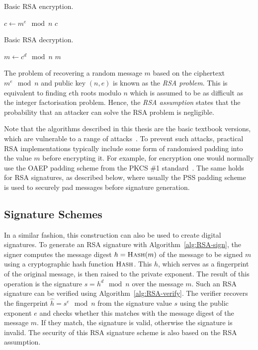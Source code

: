 \begin{algorithm}[ht]
  \caption{Basic RSA encryption.}
  \label{alg:RSA-encrypt}
  \addtolength{\baselineskip}{1mm}
  \begin{algorithmic}[1]
      \State $c \gets m^e \mod n$
      \Return $c$
    \EndFunction
  \end{algorithmic}
\end{algorithm}
\begin{algorithm}[ht]
  \caption{Basic RSA decryption.}
  \label{alg:RSA-decrypt}
  \addtolength{\baselineskip}{1mm}
  \begin{algorithmic}[1]
      \State $m \gets c^d \mod n$
      \Return $m$
    \EndFunction
  \end{algorithmic}
\end{algorithm}

The problem of recovering a random message $m$ based on the ciphertext $m^e \mod n$
and public key $(n, e)$ is known as the \emph{RSA problem}.
This is equivalent to finding $e$th roots modulo $n$ which is assumed to be as
difficult as the integer factorisation problem. Hence, the \emph{RSA assumption} states that
the probability that an attacker can solve the RSA problem is negligible.

Note that the algorithms described in this thesis are the basic textbook
versions, which are vulnerable to a range of attacks~\cite{Hastad1985,
Coppersmith1997}. To prevent such attacks, practical RSA implementations
typically include some form of randomised padding into the value $m$ before
encrypting it. For example, for encryption one would normally use the OAEP
padding scheme from the PKCS \#1 standard~\cite{PKCS_1}. The same holds for RSA
signatures, as described below, where usually the PSS padding
scheme~\cite{PKCS_1} is used to securely pad messages before signature
generation.

\subsection{Signature Schemes}

In a similar fashion, this construction can also be used to create digital
signatures. To generate an RSA signature with Algorithm~\ref{alg:RSA-sign}, the
signer computes the message digest $h = \Call{Hash}{m}$ of the message to be
signed $m$ using a cryptographic hash function $\Call{Hash}{}$. This $h$, which
serves as a fingerprint of the original message, is then raised to the private
exponent. The result of this operation is the signature $s = h^d \mod n$ over
the message $m$.
Such an RSA signature can be verified using Algorithm~\ref{alg:RSA-verify}. The
verifier recovers the fingerprint $\hat{h} = s^e \mod n$ from the signature
value $s$ using the public exponent $e$ and checks whether this matches with the
message digest of the message $m$. If they match, the signature is valid,
otherwise the signature is invalid. The security of this RSA signature scheme is
also based on the RSA assumption.

